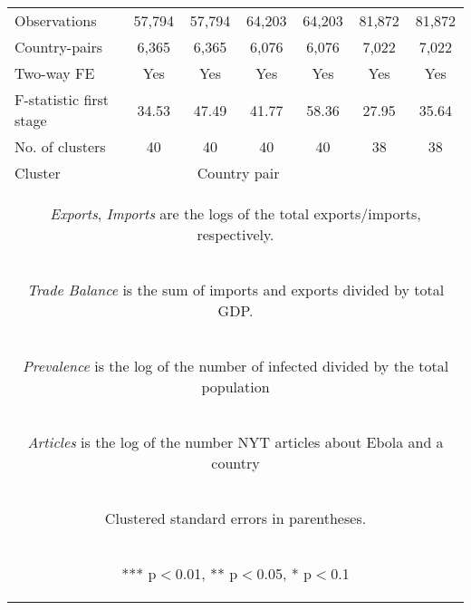 \documentclass{article}
\begin{document}
\begin{table}[htbp]
{\begin{tabular}{lcccccc}
Observations & 57,794 & 57,794 & 64,203 & 64,203 & 81,872 & 81,872 \\
Country-pairs & 6,365 & 6,365 & 6,076 & 6,076 & 7,022 & 7,022 \\
Two-way FE & Yes & Yes & Yes & Yes & Yes & Yes \\
F-statistic first stage & 34.53 & 47.49 & 41.77 & 58.36 & 27.95 & 35.64 \\
No. of clusters & 40 & 40 & 40 & 40 & 38 & 38 \\
Cluster & &\multicolumn{2}{c}{Country pair} \\ \hline
\multicolumn{7}{c}{\begin{footnotesize} \textit{Exports}, \textit{Imports} are the logs of the total exports/imports, respectively.  \end{footnotesize} }\\
\multicolumn{7}{c}{\begin{footnotesize} \textit{Trade Balance} is the sum of imports and exports divided by total GDP. \end{footnotesize} }\\
\multicolumn{7}{c}{\begin{footnotesize} \textit{Prevalence} is the log of the number of infected divided by the total population \end{footnotesize} }\\
\multicolumn{7}{c}{\begin{footnotesize} \textit{Articles} is the log of the number NYT articles about Ebola and a country \end{footnotesize} }\\
\multicolumn{7}{c}{\begin{footnotesize} Clustered standard errors in parentheses. \end{footnotesize} }\\
\multicolumn{7}{c}{\begin{footnotesize} *** p$<$0.01, ** p$<$0.05, * p$<$0.1\end{footnotesize}} \\\end{tabular}
}
\end{table}
\end{document}
